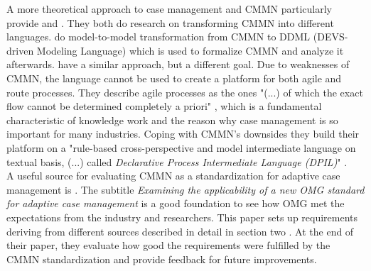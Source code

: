 A more theoretical approach to case management and CMMN particularly provide \cite{WangTraore2014} and \cite{Zeising_2014}. They both do research on transforming CMMN into different languages. \cite{WangTraore2014} do model-to-model transformation from CMMN to  DDML (DEVS-driven Modeling Language) which is used to formalize CMMN and analyze it afterwards. \cite{Zeising_2014} have a similar approach, but a different goal. Due to weaknesses of CMMN, the language cannot be used to create a platform for both agile and route processes. They describe agile processes as the ones "(...) of which the exact flow cannot be determined completely a priori" \cite{Zeising_2014}, which is a fundamental characteristic of knowledge work and the reason why case management is so important for many industries. Coping with CMMN's downsides they build their platform on a "rule-based cross-perspective and model intermediate language on textual basis, (...) called \textit{Declarative Process Intermediate Language (DPIL)}" \cite{Zeising_2014}. \\
A useful source for evaluating CMMN as a standardization for adaptive case management is \cite{KurzSchmidtFleischmannEtAl2015}. The subtitle \textit{Examining the applicability of a new OMG standard for adaptive case management} is a good foundation to see how OMG met the expectations from the industry and researchers. This paper sets up requirements deriving from different sources described in detail in section two \cite{KurzSchmidtFleischmannEtAl2015}. At the end of their paper, they evaluate how good the requirements were fulfilled by the CMMN standardization and provide feedback for future improvements. 

